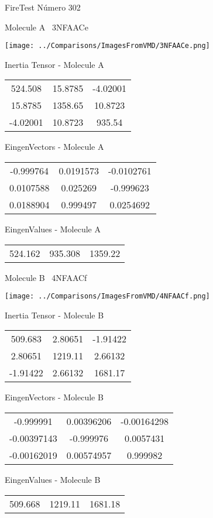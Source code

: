 \vtab[-3cm]
\begin{center}
{\large FireTest \tab Número 302}
\end{center}
\begin{multicols}{2}
\begin{center}

Molecule A \
3NFAACe

\texttt{[image: ../Comparisons/ImagesFromVMD/3NFAACe.png]}

Inertia Tensor - Molecule A \\
\begin{tabular}{|c c c|}
524.508	 & 	15.8785	 & 	-4.02001	 \\
15.8785	 & 	1358.65	 & 	10.8723	 \\
-4.02001	 & 	10.8723	 & 	935.54
\end{tabular}

\vtab
 EingenVectors - Molecule A     \\
\begin{tabular}{|c c c|}
-0.999764	 & 	0.0191573	 & 	-0.0102761	 \\
0.0107588	 & 	0.025269	 & 	-0.999623	 \\
0.0188904	 & 	0.999497	 & 	0.0254692
\end{tabular}

\vtab
 EingenValues - Molecule A     \\
\begin{tabular}{|c c c|}
524.162	 & 	935.308	 & 	1359.22	 \\
\end{tabular}
\columnbreak

Molecule B \
4NFAACf

\texttt{[image: ../Comparisons/ImagesFromVMD/4NFAACf.png]}

Inertia Tensor - Molecule B \\
\begin{tabular}{|c c c|}
509.683	 & 	2.80651	 & 	-1.91422	 \\
2.80651	 & 	1219.11	 & 	2.66132	 \\
-1.91422	 & 	2.66132	 & 	1681.17
\end{tabular}

\vtab
 EingenVectors - Molecule B     \\
\begin{tabular}{|c c c|}
-0.999991	 & 	0.00396206	 & 	-0.00164298	 \\
-0.00397143	 & 	-0.999976	 & 	0.0057431	 \\
-0.00162019	 & 	0.00574957	 & 	0.999982
\end{tabular}

\vtab
 EingenValues - Molecule B     \\
\begin{tabular}{|c c c|}
509.668	 & 	1219.11	 & 	1681.18	 \\
\end{tabular}

\end{center}
\end{multicols}

